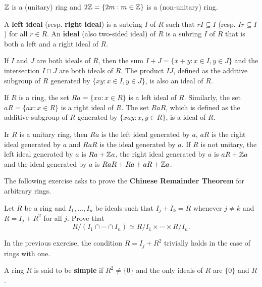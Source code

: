 \begin{example}
    $\mathbb{Z}$ is a (unitary) ring and 
	$2\mathbb{Z}=\{2m:m\in\mathbb{Z}\}$ is a (non-unitary) ring.  
\end{example}

A \textbf{left ideal} (resp. \textbf{right ideal}) is a subring $I$ of $R$ such that 
$rI\subseteq I$ (resp. $Ir\subseteq I$) for all $r\in R$. An \textbf{ideal}
(also two-sided ideal) of $R$ is a subring $I$ of $R$ that is both a left and a right ideal of $R$.

\begin{example}
	If $I$ and $J$ are both ideals of $R$, then the sum $I+J=\{x+y:x\in I,y\in J\}$ and
	the intersection $I\cap J$ are both ideals of $R$. The product $IJ$, defined as the additive
	subgroup of $R$ generated by $\{xy:x\in I,y\in J\}$, is also an ideal of $R$. 
\end{example}

\begin{example}
	If $R$ is a ring, the set $Ra =\{xa: x\in R\}$ is a left ideal
	of $R$. Similarly, the set $aR =\{ax: x\in R\}$ is a right ideal of $R$. The set $RaR$, which is
	defined as the additive subgroup of $R$ generated by $\{xay: x, y\in R\}$, is a
	ideal of $R$.
\end{example}

\begin{example}
	Ir $R$ is a unitary ring, then $Ra$ is the left ideal generated by $a$, $aR$ is
	the right ideal generated by $a$ and $RaR$ is the ideal generated by $a$. 
	If $R$ is not unitary, the left ideal generated by $a$ is $Ra+\mathbb{Z} a$,
	the right ideal generated by $a$ is $aR+\mathbb{Z} a$ and the ideal generated by 
	$a$ is $RaR+Ra+aR+\mathbb{Z} a$.
\end{example}

The following exercise asks to prove the \textbf{Chinese Remainder Theorem}  
for arbitrary rings.

\begin{exercise}
    \label{xca:chinese}
    Let $R$ be a ring and $I_1,\dots,I_n$ be ideals such that 
    $I_j+I_k=R$ whenever $j\ne k$ and $R=I_j+R^2$ for all $j$. Prove that 
    \[
    R/(I_1\cap\cdots\cap I_n)\simeq R/I_1\times\cdots\times R/I_n.
    \]
\end{exercise}

In the previous exercise, the condition $R=I_j+R^2$ trivially holds in the case of rings with one. 

\begin{definition}
A ring $R$ is said to be \textbf{simple} if $R^2\ne\{0\}$ and the only ideals of 
$R$ are $\{0\}$ and $R$.  
\end{definition}

